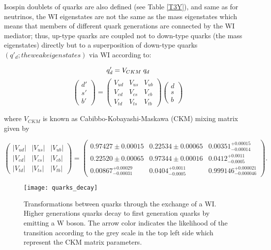 Isospin doublets of quarks are also defined (see Table \ref{T3Y}), and same as for neutrinos, the WI eigenstates are not the same as the mass eigenstates which means that members of different quark generations are connected by the WI mediator; thus, up-type quarks are coupled not to down-type quarks (the mass eigenstates) directly but to a superposition of down-type quarks $(q'_d; the weak eigenstates)$ via WI according to: 

$$q'_d = V_{CKM}\hspace{0.1cm}q_d$$
\begin{equation}
\begin{pmatrix}d'\\ s'\\ b'\end{pmatrix}=\begin{pmatrix} V_{ud} & V_{us} & V_{ub}\\ V_{cd} & V_{cs} & V_{cb}\\ V_{td} & V_{ts} & V_{tb}\end{pmatrix}\begin{pmatrix}d\\s\\b\end{pmatrix}
\label{eq:qmixing}
\end{equation}

\noindent where $V_{CKM}$ is known as Cabibbo-Kobayashi-Maskawa (CKM) mixing matrix\cite{C,KM} given by  

\begin{equation}
\begin{pmatrix}
|V_{ud}| & |V_{us}| & |V_{ub}| \\
|V_{cd}| & |V_{cs}| & |V_{cb}| \\
|V_{td}| & |V_{ts}| & |V_{tb}|
\end{pmatrix} = \begin{pmatrix}
0.97427 \pm 0.00015 & 0.22534 \pm 0.00065 & 0.00351^{+0.00015}_{-0.00014} \\
0.22520 \pm 0.00065 & 0.97344 \pm 0.00016 & 0.0412^{+0.0011}_{-0.0005} \\
0.00867^{+0.00029}_{-0.00031} & 0.0404^{+0.0011}_{-0.0005} & 0.999146^{+0.000021}_{-0.000046}
\end{pmatrix}.
\label{eq:ckm}
\end{equation}

\begin{figure}[!h]
  \centering
  \texttt{[image: quarks\_decay]}
  \caption[Transformations between quarks]{Transformations between quarks through the exchange of a WI. Higher generations quarks decay to first generation quarks by emitting a W boson. The arrow color indicates the likelihood of the transition according to the grey scale in the top left side which represent the CKM matrix parameters\cite{ckm}.}
  \label{quarks_decay}
\end{figure}

